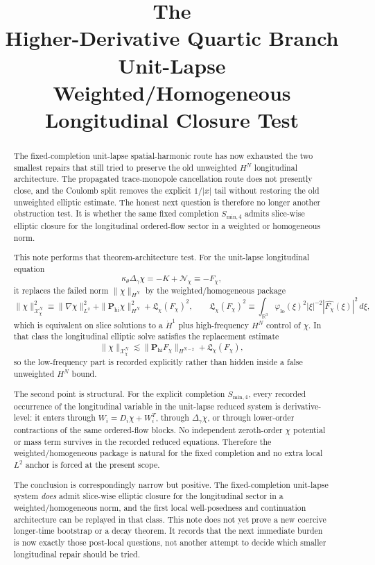 \documentclass[11pt]{article}
\title{\textbf{The \TheoryName{}}\\[0.4em]
\large Higher-Derivative Quartic Branch Unit-Lapse Weighted/Homogeneous Longitudinal Closure Test}
\author{}
\date{}
\begin{document}
\maketitle

\begin{abstract}
The fixed-completion unit-lapse spatial-harmonic route has now exhausted the two smallest repairs that still tried to preserve the old unweighted \(H^N\) longitudinal architecture. The propagated trace-monopole cancellation route does not presently close, and the Coulomb split removes the explicit \(1/|x|\) tail without restoring the old unweighted elliptic estimate. The honest next question is therefore no longer another obstruction test. It is whether the same fixed completion \(S_{\mathrm{min},4}\) admits slice-wise elliptic closure for the longitudinal ordered-flow sector in a weighted or homogeneous norm.

This note performs that theorem-architecture test. For the unit-lapse longitudinal equation
\[
\kappa_\theta \Delta_\gamma \chi
=
-K+\mathcal N_\chi
\equiv
-F_\chi,
\]
it replaces the failed norm \(\|\chi\|_{H^N}\) by the weighted/homogeneous package
\[
\|\chi\|_{\mathcal X_\chi^N}^2
\equiv
\|\nabla\chi\|_{L^2}^2
+ \|\mathbf P_{\mathrm{hi}}\chi\|_{H^N}^2
+ \mathfrak L_\chi(F_\chi)^2,
\qquad
\mathfrak L_\chi(F_\chi)^2
\equiv
\int_{\mathbb R^3}\varphi_{\mathrm{lo}}(\xi)^2 |\xi|^{-2}|\widehat{F_\chi}(\xi)|^2\,d\xi,
\]
which is equivalent on slice solutions to a \(\dot H^1\) plus high-frequency \(H^N\) control of \(\chi\). In that class the longitudinal elliptic solve satisfies the replacement estimate
\[
\|\chi\|_{\mathcal X_\chi^N}
\lesssim
\|\mathbf P_{\mathrm{hi}}F_\chi\|_{H^{N-2}}
+ \mathfrak L_\chi(F_\chi),
\]
so the low-frequency part is recorded explicitly rather than hidden inside a false unweighted \(H^N\) bound.

The second point is structural. For the explicit completion \(S_{\mathrm{min},4}\), every recorded occurrence of the longitudinal variable in the unit-lapse reduced system is derivative-level: it enters through \(W_i=D_i\chi+W_i^T\), through \(\Delta_\gamma\chi\), or through lower-order contractions of the same ordered-flow blocks. No independent zeroth-order \(\chi\) potential or mass term survives in the recorded reduced equations. Therefore the weighted/homogeneous package is natural for the fixed completion and no extra local \(L^2\) anchor is forced at the present scope.

The conclusion is correspondingly narrow but positive. The fixed-completion unit-lapse system \emph{does} admit slice-wise elliptic closure for the longitudinal sector in a weighted/homogeneous norm, and the first local well-posedness and continuation architecture can be replayed in that class. This note does not yet prove a new coercive longer-time bootstrap or a decay theorem. It records that the next immediate burden is now exactly those post-local questions, not another attempt to decide which smaller longitudinal repair should be tried.
\end{abstract}
\end{document}
